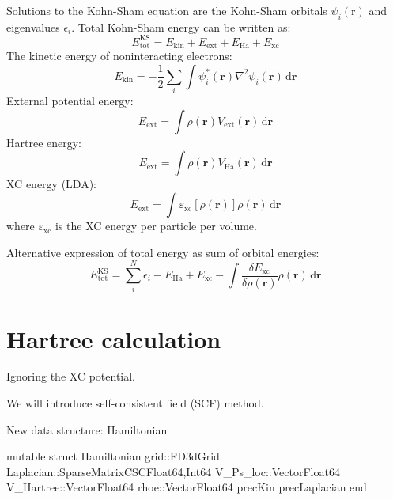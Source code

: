 Solutions to the Kohn-Sham equation are the Kohn-Sham orbitals
$\psi_{i}(\mathrm{r})$ and eigenvalues $\epsilon_{i}$.
Total Kohn-Sham energy can be written as:
\begin{equation}
E^{\mathrm{KS}}_{\mathrm{tot}} = E_{\mathrm{kin}} + E_{\mathrm{ext}}
+ E_{\mathrm{Ha}} + E_{\mathrm{xc}}
\end{equation}
%
The kinetic energy of noninteracting electrons:
\begin{equation}
E_{\mathrm{kin}} = -\frac{1}{2}\sum_{i} \int \psi_{i}^{*}(\mathbf{r}) \nabla^2 \psi_{i}(\mathbf{r})
\,\mathrm{d}\mathbf{r}
\end{equation}
%
External potential energy:
\begin{equation}
E_{\mathrm{ext}} = \int \rho(\mathbf{r}) V_{\mathrm{ext}}(\mathbf{r})
\,\mathrm{d}\mathbf{r}
\end{equation}
%
Hartree energy:
\begin{equation}
E_{\mathrm{ext}} = \int \rho(\mathbf{r}) V_{\mathrm{Ha}}(\mathbf{r})
\,\mathrm{d}\mathbf{r}
\end{equation}
%
XC energy (LDA):
\begin{equation}
E_{\mathrm{ext}} = \int \varepsilon_{\mathrm{xc}}[\rho(\mathbf{r})] \rho(\mathbf{r})
\,\mathrm{d}\mathbf{r}
\end{equation}
where $\varepsilon_{\mathrm{xc}}$ is the XC energy per particle per volume.

Alternative expression of total energy as sum of orbital energies:
\begin{equation}
E^{\mathrm{KS}}_{\mathrm{tot}} = \sum_{i}^{N} \epsilon_{i} - E_{\mathrm{Ha}} + E_{\mathrm{xc}}
- \int \frac{\delta E_{\mathrm{xc}}}{\delta \rho(\mathbf{r})} \rho(\mathbf{r})
\,\mathrm{d}\mathbf{r}
\end{equation}




\section{Hartree calculation}

Ignoring the XC potential.

We will introduce self-consistent field (SCF) method.

New data structure: Hamiltonian

\begin{juliacode}
mutable struct Hamiltonian
  grid::FD3dGrid
  Laplacian::SparseMatrixCSC{Float64,Int64}
  V_Ps_loc::Vector{Float64}
  V_Hartree::Vector{Float64}
  rhoe::Vector{Float64}
  precKin
  precLaplacian
end
\end{juliacode}

